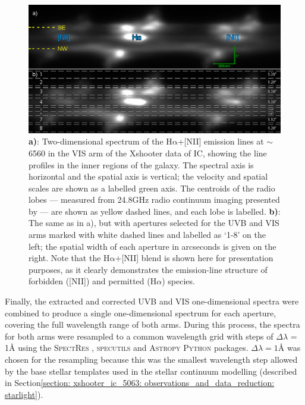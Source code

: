 \begin{figure}[!t]
	\includegraphics[width=\linewidth]{figures/xshooter_ic5063/apertures.png}
	\caption[Two-dimensional long-slit spectra along the radio axis of IC, with the positions of extracted apertures overlaid.]{\textbf{a)}: Two-dimensional spectrum of the H$\mathrm{\alpha}$+[NII] emission lines at $\sim$6560\;{\AA} in the VIS arm of the Xshooter data of IC, showing the line profiles in the inner regions of the galaxy. The spectral axis is horizontal and the spatial axis is vertical; the velocity and spatial scales are shown as a labelled green axis. The centroids of the radio lobes --- measured from 24.8\;GHz radio continuum imaging presented by \citet{Morganti2007} --- are shown as yellow dashed lines, and each lobe is labelled. \textbf{b)}: The same as in a), but with apertures selected for the UVB and VIS arms marked with white dashed lines and labelled as `1-8' on the left; the spatial width of each aperture in arcseconds is given on the right. Note that the H$\mathrm{\alpha}$+[NII] blend is shown here for presentation purposes, as it clearly demonstrates the emission-line structure of forbidden ([NII]) and permitted (H$\alpha$) species.}
	\label{fig: xshooter_ic5063: apertures}
\end{figure}

Finally, the extracted and corrected UVB and VIS one-dimensional spectra were combined to produce a single one-dimensional spectrum for each aperture, covering the full wavelength range of both arms. During this process, the spectra for both arms were resampled to a common wavelength grid with steps of $\Delta\lambda$ = 1{\;\AA} using the \textsc{SpectRes} \citep{Carnall2017}, \textsc{specutils} \citep{Earl2021} and \textsc{Astropy} \citep{AstropyCollaboration2013, AstropyCollaboration2018} \textsc{Python} packages. $\Delta\lambda = 1${\;\AA} was chosen for the resampling because this was the smallest wavelength step allowed by the base stellar templates used in the stellar continuum modelling (described in Section\;\ref{section: xshooter_ic_5063: observations_and_data_reduction: starlight}). 

